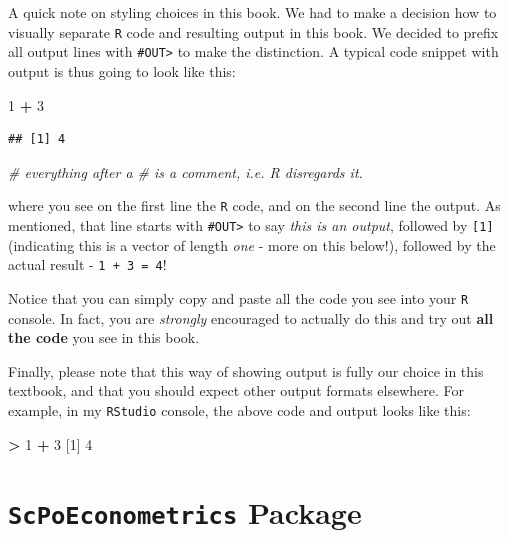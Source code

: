 \documentclass[]{book}
\newenvironment{Shaded}{\begin{snugshade}}{\end{snugshade}}
\newcommand{\DecValTok}[1]{\textcolor[rgb]{0.00,0.00,0.81}{#1}}
\newcommand{\StringTok}[1]{\textcolor[rgb]{0.31,0.60,0.02}{#1}}
\newcommand{\CommentTok}[1]{\textcolor[rgb]{0.56,0.35,0.01}{\textit{#1}}}
\newcommand{\OperatorTok}[1]{\textcolor[rgb]{0.81,0.36,0.00}{\textbf{#1}}}
\newcommand{\NormalTok}[1]{#1}
\begin{document}
A quick note on styling choices in this book. We had to make a decision
how to visually separate \texttt{R} code and resulting output in this
book. We decided to prefix all output lines with
\texttt{\#OUT\textgreater{}} to make the distinction. A typical code
snippet with output is thus going to look like this:

\begin{Shaded}
\begin{Highlighting}[]
\DecValTok{1} \OperatorTok{+}\StringTok{ }\DecValTok{3}
\end{Highlighting}
\end{Shaded}

\begin{verbatim}
## [1] 4
\end{verbatim}

\begin{Shaded}
\begin{Highlighting}[]
\CommentTok{# everything after a # is a comment, i.e. R disregards it.}
\end{Highlighting}
\end{Shaded}

where you see on the first line the \texttt{R} code, and on the second
line the output. As mentioned, that line starts with
\texttt{\#OUT\textgreater{}} to say \emph{this is an output}, followed
by \texttt{{[}1{]}} (indicating this is a vector of length \emph{one} -
more on this below!), followed by the actual result -
\texttt{1\ +\ 3\ =\ 4}!

Notice that you can simply copy and paste all the code you see into your
\texttt{R} console. In fact, you are \emph{strongly} encouraged to
actually do this and try out \textbf{all the code} you see in this book.

Finally, please note that this way of showing output is fully our choice
in this textbook, and that you should expect other output formats
elsewhere. For example, in my \texttt{RStudio} console, the above code
and output looks like this:

\begin{Shaded}
\begin{Highlighting}[]
\OperatorTok{>}\StringTok{ }\DecValTok{1} \OperatorTok{+}\StringTok{ }\DecValTok{3}
\NormalTok{[}\DecValTok{1}\NormalTok{] }\DecValTok{4}
\end{Highlighting}
\end{Shaded}

\section{\texorpdfstring{\texttt{ScPoEconometrics}
Package}{ScPoEconometrics Package}}\label{install-package}
\end{document}
